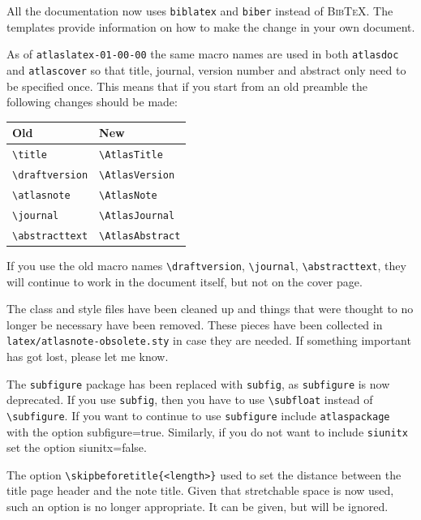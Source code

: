 \documentclass[UKenglish]{latex/atlasdoc}
\newcommand{\BibTeX}{\textsc{Bib\TeX}}
\newcommand{\File}[1]{\texttt{#1}\xspace}
\newcommand{\Macro}[1]{\texttt{\textbackslash #1}\xspace}
\newcommand{\Option}[1]{\textsf{#1}\xspace}
\newcommand{\Package}[1]{\texttt{#1}\xspace}
\begin{document}
All the documentation now uses \texttt{biblatex} and \texttt{biber} instead of \BibTeX.
The templates provide information on how to make the change in your own document.

As of \File{atlaslatex-01-00-00} the same macro names are used in both \Package{atlasdoc} and
\Package{atlascover} so that title, journal, version number and abstract only need to be specified once.
This means that if you start from an old preamble the following changes should be made:
\begin{center}
  \begin{tabular}{ll}
    Old	& New\\
    \midrule
    \Macro{title} & \Macro{AtlasTitle}\\
    \Macro{draftversion} & \Macro{AtlasVersion}\\
    \Macro{atlasnote} & \Macro{AtlasNote}\\
    \Macro{journal} & \Macro{AtlasJournal}\\
    \Macro{abstracttext} & \Macro{AtlasAbstract}
  \end{tabular}
\end{center}
If you use the old macro names 
\Macro{draftversion}, \Macro{journal}, \Macro{abstracttext},
they will continue to work in the document itself, but not on the cover page.

The class and style files have been cleaned up and things 
that were thought to no longer be necessary have been removed.
These pieces have been collected in \texttt{latex/atlasnote-obsolete.sty} in case they are needed.
If something important has got lost, please let me know.

The \Package{subfigure} package has been replaced with \Package{subfig}, as \Package{subfigure} is now deprecated.
If you use \Package{subfig}, then you have to use \Macro{subfloat} instead of \Macro{subfigure}.
If you want to continue to use \Package{subfigure} include \Package{atlaspackage} with the option
\Option{subfigure=true}. Similarly, if you do not want to include \Package{siunitx} set
the option \Option{siunitx=false}.

The option \verb|\skipbeforetitle{<length>}| used to set the distance between
the title page header and the note title. 
Given that stretchable space is now used, such an option is no longer appropriate.
It can be given, but will be ignored.
\end{document}
